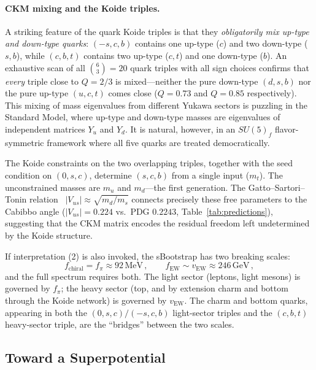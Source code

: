 \documentclass[12pt,a4paper]{article}
\newcommand{\MeV}{\,\text{MeV}}
\newcommand{\GeV}{\,\text{GeV}}
\begin{document}
\paragraph{CKM mixing and the Koide triples.}
A striking feature of the quark Koide triples is that they
\emph{obligatorily mix up-type and down-type quarks}: $(-s,c,b)$
contains one up-type ($c$) and two down-type ($s,b$), while
$(c,b,t)$ contains two up-type ($c,t$) and one down-type ($b$). An
exhaustive scan of all $\binom{6}{3} = 20$ quark triples with all
sign choices confirms that \emph{every} triple close to $Q = 2/3$ is
mixed---neither the pure down-type $(d,s,b)$ nor the pure up-type
$(u,c,t)$ comes close ($Q = 0.73$ and $Q = 0.85$ respectively).
This mixing of mass eigenvalues from different Yukawa sectors is
puzzling in the Standard Model, where up-type and down-type masses are
eigenvalues of independent matrices $Y_u$ and $Y_d$. It is natural,
however, in an $SU(5)_f$ flavor-symmetric framework where all five
quarks are treated democratically.

The Koide constraints on the two overlapping triples, together with
the seed condition on $(0,s,c)$, determine $(s,c,b)$ from a single
input ($m_t$). The unconstrained masses are $m_u$ and $m_d$---the
first generation. The Gatto--Sartori--Tonin relation~\cite{GST1968} $|V_{us}| \approx
\sqrt{m_d/m_s}$ connects precisely these free parameters to the
Cabibbo angle ($|V_{us}| = 0.224$ vs.\ PDG $0.2243$,
Table~\ref{tab:predictions}), suggesting that the CKM matrix
encodes the residual freedom left undetermined by the Koide
structure.

If interpretation (2) is also invoked, the sBootstrap has two breaking 
scales:
\begin{equation}
f_{\text{chiral}} = f_\pi \approx 92\MeV\,, \qquad
f_{\text{EW}} \sim v_{\text{EW}} \approx 246\GeV\,,
\end{equation}
and the full spectrum requires both. The light sector (leptons, 
light mesons) is governed by $f_\pi$; the heavy sector (top, and 
by extension charm and bottom through the Koide network) is 
governed by $v_{\text{EW}}$. The charm and bottom quarks, 
appearing in both the $(0,s,c)/(-s,c,b)$ light-sector triples 
and the $(c,b,t)$ heavy-sector triple, are the ``bridges'' 
between the two scales.

\subsection{Toward a Superpotential}
\label{subsec:superpotential}
\end{document}
